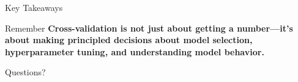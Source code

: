 \documentclass[8pt,aspectratio=1610]{beamer}
\begin{document}
\begin{frame}{Key Takeaways}
\begin{alertblock}{Remember}
\textbf{Cross-validation is not just about getting a number—it's about making principled decisions about model selection, hyperparameter tuning, and understanding model behavior.}
\end{alertblock}
\end{frame}

\begin{frame}[standout]
Questions?
\end{frame}
\end{document}
